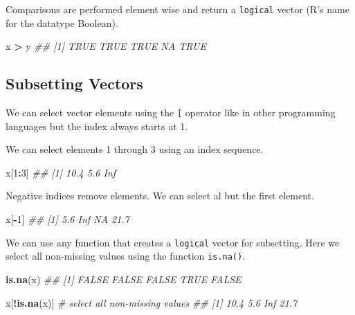 \documentclass[
  notitlepage]{book}
\newenvironment{Shaded}{\begin{snugshade}}{\end{snugshade}}
\newcommand{\CommentTok}[1]{\textcolor[rgb]{0.56,0.35,0.01}{\textit{#1}}}
\newcommand{\DecValTok}[1]{\textcolor[rgb]{0.00,0.00,0.81}{#1}}
\newcommand{\KeywordTok}[1]{\textcolor[rgb]{0.13,0.29,0.53}{\textbf{#1}}}
\newcommand{\NormalTok}[1]{#1}
\newcommand{\OperatorTok}[1]{\textcolor[rgb]{0.81,0.36,0.00}{\textbf{#1}}}
\newcommand{\StringTok}[1]{\textcolor[rgb]{0.31,0.60,0.02}{#1}}
\begin{document}
Comparisons are performed element wise and return a \texttt{logical} vector
(R's name for the datatype Boolean).

\begin{Shaded}
\begin{Highlighting}[]
\NormalTok{x }\OperatorTok{\textgreater{}}\StringTok{ }\NormalTok{y}
\CommentTok{\#\# [1] TRUE TRUE TRUE   NA TRUE}
\end{Highlighting}
\end{Shaded}

\hypertarget{subsetting-vectors}{%
\subsection{Subsetting Vectors}\label{subsetting-vectors}}

We can select vector elements using the \texttt{{[}} operator like in other
programming languages but the index always starts at 1.

We can select elements 1 through 3 using an index sequence.

\begin{Shaded}
\begin{Highlighting}[]
\NormalTok{x[}\DecValTok{1}\OperatorTok{:}\DecValTok{3}\NormalTok{]}
\CommentTok{\#\# [1] 10.4  5.6  Inf}
\end{Highlighting}
\end{Shaded}

Negative indices remove elements. We can select al but the first element.

\begin{Shaded}
\begin{Highlighting}[]
\NormalTok{x[}\OperatorTok{{-}}\DecValTok{1}\NormalTok{]}
\CommentTok{\#\# [1]  5.6  Inf   NA 21.7}
\end{Highlighting}
\end{Shaded}

We can use any function that creates a \texttt{logical} vector for subsetting.
Here we select all non-missing values using the function \texttt{is.na()}.

\begin{Shaded}
\begin{Highlighting}[]
\KeywordTok{is.na}\NormalTok{(x)}
\CommentTok{\#\# [1] FALSE FALSE FALSE  TRUE FALSE}
\end{Highlighting}
\end{Shaded}

\begin{Shaded}
\begin{Highlighting}[]
\NormalTok{x[}\OperatorTok{!}\KeywordTok{is.na}\NormalTok{(x)] }\CommentTok{\# select all non{-}missing values}
\CommentTok{\#\# [1] 10.4  5.6  Inf 21.7}
\end{Highlighting}
\end{Shaded}
\end{document}
